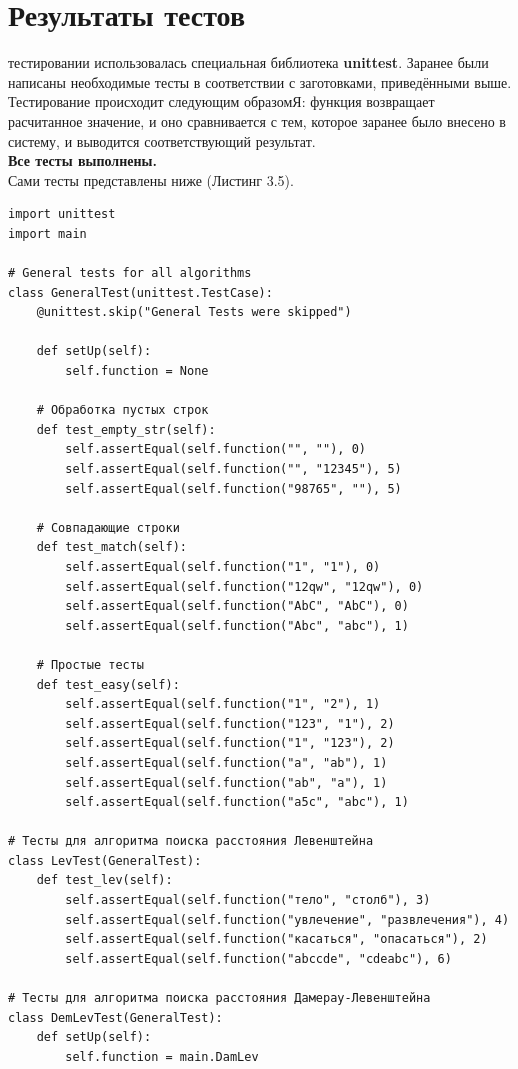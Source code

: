 \documentclass[12pt]{report}
\begin{document}
\section{Результаты тестов}
 тестировании использовалась специальная библиотека \textbf{unittest}. Заранее были написаны необходимые тесты в соответствии с заготовками, приведёнными выше. Тестирование происходит следующим образомЯ: функция возвращает расчитанное значение, и оно сравнивается с тем, которое заранее было внесено в систему, и выводится соответствующий результат.\\

\textbf{Все тесты выполнены.}\\

Сами тесты представлены ниже (Листинг 3.5).
\begin{lstlisting}[label=some-code, caption = Тесты]
import unittest
import main
	
# General tests for all algorithms
class GeneralTest(unittest.TestCase):
	@unittest.skip("General Tests were skipped")
	
	def setUp(self):
		self.function = None
	
	# Обработка пустых строк
	def test_empty_str(self):
		self.assertEqual(self.function("", ""), 0)
		self.assertEqual(self.function("", "12345"), 5)
		self.assertEqual(self.function("98765", ""), 5)
	
    # Совпадающие строки
	def test_match(self):
		self.assertEqual(self.function("1", "1"), 0)
		self.assertEqual(self.function("12qw", "12qw"), 0)
		self.assertEqual(self.function("AbC", "AbC"), 0)
		self.assertEqual(self.function("Abc", "abc"), 1)
	
	# Простые тесты
	def test_easy(self):
		self.assertEqual(self.function("1", "2"), 1)
		self.assertEqual(self.function("123", "1"), 2)
		self.assertEqual(self.function("1", "123"), 2)
		self.assertEqual(self.function("a", "ab"), 1)
		self.assertEqual(self.function("ab", "a"), 1)
		self.assertEqual(self.function("a5c", "abc"), 1)
	
# Тесты для алгоритма поиска расстояния Левенштейна
class LevTest(GeneralTest):
	def test_lev(self):
		self.assertEqual(self.function("тело", "столб"), 3)
		self.assertEqual(self.function("увлечение", "развлечения"), 4)
		self.assertEqual(self.function("касаться", "опасаться"), 2)
		self.assertEqual(self.function("abccde", "cdeabc"), 6)
	
# Тесты для алгоритма поиска расстояния Дамерау-Левенштейна
class DemLevTest(GeneralTest):
	def setUp(self):
		self.function = main.DamLev
	

\end{lstlisting}
\end{document}
